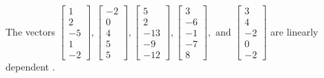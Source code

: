 \begin{exercise}
\begin{exerciseStatement}
  \end{exerciseStatement}
  \begin{exerciseAnswer}
   The vectors \(\left[\begin{array}{r}
1 \\
2 \\
-5 \\
1 \\
-2
\end{array}\right] , \left[\begin{array}{r}
-2 \\
0 \\
4 \\
5 \\
5
\end{array}\right] , \left[\begin{array}{r}
5 \\
2 \\
-13 \\
-9 \\
-12
\end{array}\right] , \left[\begin{array}{r}
3 \\
-6 \\
-1 \\
-7 \\
8
\end{array}\right] , \text{ and } \left[\begin{array}{r}
3 \\
4 \\
-2 \\
0 \\
-2
\end{array}\right]\) are 
  	 linearly dependent  .
  


  \end{exerciseAnswer}
\end{exercise}